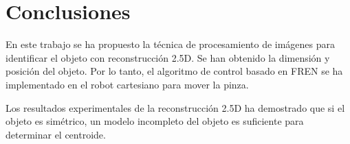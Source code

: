 \chapter{Conclusiones}








En este trabajo se ha propuesto la técnica de procesamiento de imágenes para identificar el objeto con reconstrucción 2.5D. Se han obtenido la dimensión y posición del objeto. Por lo tanto, el algoritmo de control basado en FREN se ha implementado en el robot cartesiano para mover la pinza.


Los resultados experimentales de la reconstrucción 2.5D ha demostrado que si el objeto es simétrico, un modelo incompleto del objeto es suficiente para determinar el centroide.


